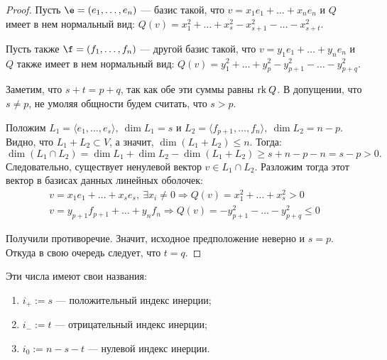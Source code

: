 \begin{proof}
Пусть $\e = \vector{e}$ --- базис такой, что $v = x_1e_1 + \ldots + x_ne_n$ и $Q$ имеет в нем нормальный вид: $Q(v) = x_1^2 + \ldots + x_s^2 - x_{s + 1}^2 - \ldots - x_{s + t}^2$. 

Пусть также $\f = \vector{f}$ --- другой базис такой, что $v = y_1e_1 + \ldots + y_ne_n$ и $Q$ также имеет в нем нормальный вид: $Q(v) = y_1^2 + \ldots + y_p^2 - y_{p + 1}^2 - \ldots - y_{p + q}^2$.

Заметим, что $s + t = p + q$, так как обе эти суммы равны $\mathrm{rk}\: Q$. В допущении, что $s \neq p$, не умоляя общности будем считать, что $s > p$.

Положим $L_1 = \langle e_1, \ldots, e_s \rangle,\ \dim L_1 = s$ и $L_2 = \langle f_{p + 1}, \ldots, f_{n}\rangle,\ \dim L_2 = n - p$. Видно, что $L_1 + L_2 \subset V$, а значит, $\dim(L_1 + L_2) \leqslant n$. Тогда:
$$
\dim(L_1 \cap L_2) = \dim L_1 + \dim L_2 - \dim(L_1 + L_2) \geqslant s + n - p - n = s - p > 0.
$$
Следовательно, существует ненулевой вектор $v \in L_1 \cap L_2$. Разложим тогда этот вектор в базисах данных линейных оболочек:
\begin{gather*}
v = x_1e_1 + \ldots + x_se_s,\ \exists x_i \neq 0 \Rightarrow Q(v) = x_1^2 + \ldots + x_s^2 >0 \\
v = y_{p + 1}f_{p + 1} + \ldots + y_nf_n \Rightarrow Q(v) = -y_{p+1}^2 - \ldots - y_{p + q}^2 \leqslant 0
\end{gather*}

Получили противоречие. Значит, исходное предположение неверно и $s = p$. Откуда в свою очередь следует, что $t = q$.
\end{proof}

\begin{Def}
Эти числа имеют свои названия:
\begin{enumerate}
\item $i_+ := s$ --- положительный индекс инерции;
\item $i_- := t$ --- отрицательный индекс инерции;
\item $i_0 := n - s - t$ --- нулевой индекс инерции.
\end{enumerate}
\end{Def}

